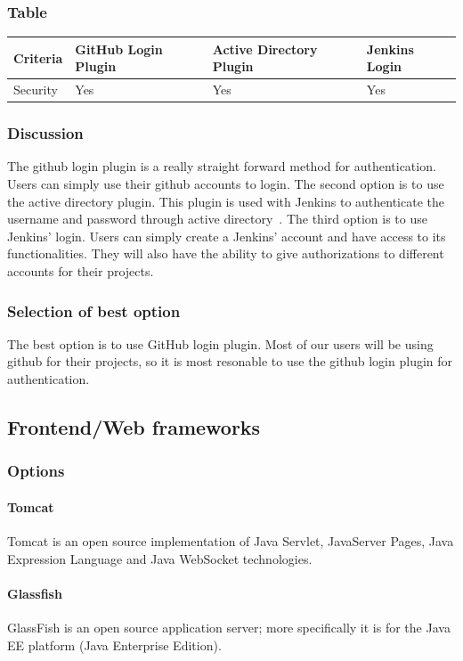 \documentclass[10pt,letterpaper,onecolumn,draftclsnofoot]{IEEEtran}
\begin{document}
\subsubsection{Table}
\begin{center}
  \begin{tabular}{llll}
    Criteria & GitHub Login Plugin & Active Directory Plugin & Jenkins Login\\ \midrule
    Security       & Yes & Yes & Yes \\ \midrule
  \end{tabular}
\end{center}
\subsubsection{Discussion}
The github login plugin is a really straight forward method for authentication.
Users can simply use their github accounts to login.
The second option is to use the active directory plugin.
This plugin is used with Jenkins to authenticate the username and password through active directory~\cite{activedirectory}.
The third option is to use Jenkins’ login.
Users can simply create a Jenkins’ account and have access to its functionalities.
They will also have the ability to give authorizations to different accounts for their projects.
\subsubsection{Selection of best option}
The best option is to use GitHub login plugin.
Most of our users will be using github for their projects, so it is most resonable to use the github login plugin for authentication.

\subsection{Frontend/Web frameworks}
\subsubsection{Options}
\paragraph{Tomcat}
Tomcat is an open source implementation of Java Servlet, JavaServer Pages, Java Expression Language and Java WebSocket technologies. 
\paragraph{Glassfish}
GlassFish is an open source application server; more specifically it is for the Java EE platform (Java Enterprise Edition).
\end{document}
